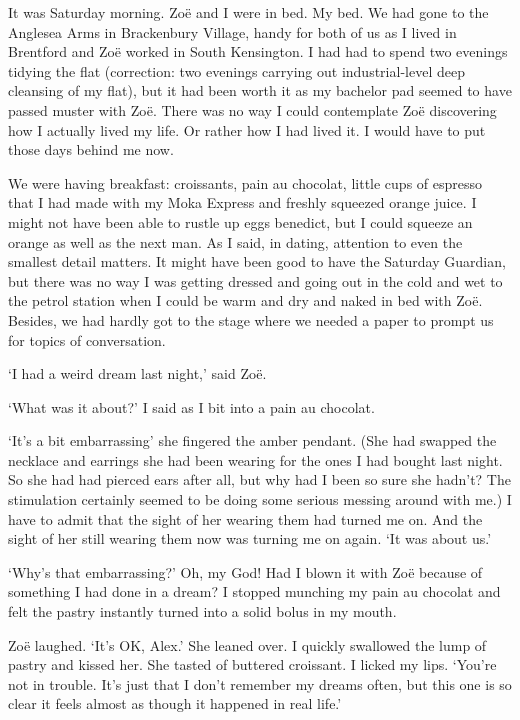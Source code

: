 \vskip 1cm

It was Saturday morning. Zoë and I were in bed. {\twelveit My\/}
bed. We had gone to the Anglesea Arms in Brackenbury Village, handy
for both of us as I lived in Brentford and Zoë worked in South
Kensington. I had had to spend two evenings tidying the flat
(correction: two evenings carrying out industrial-level deep
cleansing of my flat), but it had been worth it as my bachelor pad
seemed to have passed muster with Zoë. There was no way I could
contemplate Zoë discovering how I actually lived my life. Or
rather how I had lived it. I would have to put those days behind me
now.

We were having breakfast: croissants, pain au chocolat, little cups
of espresso that I had made with my Moka Express and freshly
squeezed orange juice. I might not have been able to rustle up eggs
benedict, but I could squeeze an orange as well as the next man. As
I said, in dating, attention to even the smallest detail matters. It
might have been good to have the Saturday {\twelvesl Guardian\/},
but there was no way I was getting dressed and going out in the cold
and wet to the petrol station when I could be warm and dry and naked
in bed with Zoë. Besides, we had hardly got to the stage where
we needed a paper to prompt us for topics of conversation.

`I had a weird dream last night,' said Zoë.

`What was it about?' I said as I bit into a pain au chocolat.

`It's a bit embarrassing' she fingered the amber pendant. (She had swapped the necklace and earrings she had been wearing for the ones I had bought last night. So she had had pierced ears after all, but why had I been so sure she hadn't? The stimulation certainly seemed to be doing some serious messing around with me.) I have to admit that the sight of her
wearing them had turned me on. And the sight of her still wearing
them now was turning me on again. `It was
about us.'

`Why's that embarrassing?' Oh, my God! Had I blown it with Zoë
because of something I had done in a dream? I stopped munching my
pain au chocolat and felt the pastry instantly turned into a solid
bolus in my mouth.

Zoë laughed. `It's OK, Alex.' She leaned over. I quickly
swallowed the lump of pastry and kissed her. She tasted of buttered
croissant. I licked my lips. `You're not in trouble. It's just that
I don't remember my dreams often, but this one is so clear it feels almost as though it happened in real life.'

